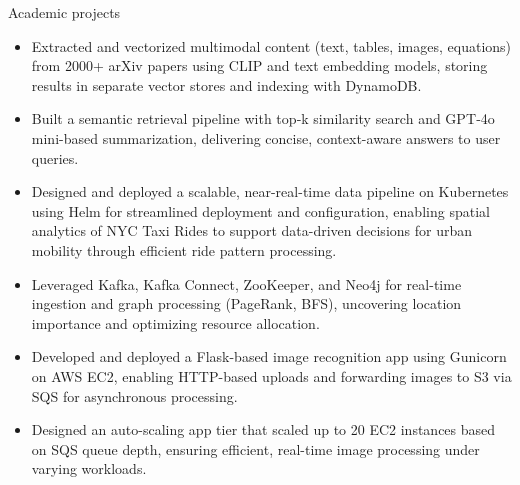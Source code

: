 \documentclass{resume}
\begin{document}
\begin{experienceSection}{Academic projects}

    \projectItem[
        title=RAG Implementation for arXiv Papers,
        duration={Oct 2024 - Nov 2024},
    ]
    \begin{itemize}
        \vspace{-0.5em}
        \itemsep -6pt {}
        \item Extracted and vectorized multimodal content (text, tables, images, equations) from 2000+ arXiv papers using CLIP and text embedding models, storing results in separate vector stores and indexing with DynamoDB.
        \item Built a semantic retrieval pipeline with top‑k similarity search and GPT‑4o mini-based summarization, delivering concise, context-aware answers to user queries.
    \end{itemize}
    
    \projectItem[
        title=Kubernetes based Data Processing Pipeline,
        duration={Oct 2024 - Nov 2024},
    ]
    \begin{itemize}
        \vspace{-0.5em}
        \itemsep -6pt {}
        \item Designed and deployed a scalable, near-real-time data pipeline on Kubernetes using Helm for streamlined deployment and configuration, enabling spatial analytics of NYC Taxi Rides to support data-driven decisions for urban mobility through efficient ride pattern processing.
        \item Leveraged Kafka, Kafka Connect, ZooKeeper, and Neo4j for real-time ingestion and graph processing (PageRank, BFS), uncovering location importance and optimizing resource allocation.
    \end{itemize}

    \projectItem[
        title=AWS-Based Face Recognition App,
        duration={Feb 2024 - May 2024},
    ]
    \begin{itemize}
        \vspace{-0.5em}
        \itemsep -6pt {}
        \item Developed and deployed a Flask-based image recognition app using Gunicorn on AWS EC2, enabling HTTP-based uploads and forwarding images to S3 via SQS for asynchronous processing.
        \item Designed an auto-scaling app tier that scaled up to 20 EC2 instances based on SQS queue depth, ensuring efficient, real-time image processing under varying workloads.
    \end{itemize}


\end{experienceSection}
\end{document}
